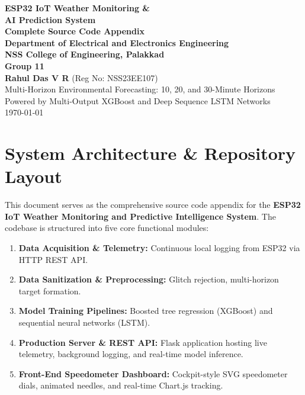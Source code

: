 \documentclass[11pt,a4paper]{article}
\begin{document}
\begin{titlepage}
    \centering
    \vspace*{2cm}
    
    {\Huge \textbf{ESP32 IoT Weather Monitoring \&\\ AI Prediction System}}\\[0.8cm]
    {\LARGE \textbf{Complete Source Code Appendix}}\\[1.5cm]
    
    \textbf{Department of Electrical and Electronics Engineering}\\[0.3cm]
    \textbf{NSS College of Engineering, Palakkad}\\[1.5cm]
    
    \textbf{Group 11}\\[0.4cm]
    \textbf{Rahul Das V R} (Reg No: NSS23EE107)\\[2.5cm]
    
    \vfill
    {\large Multi-Horizon Environmental Forecasting: 10, 20, and 30-Minute Horizons}\\[0.2cm]
    {\large Powered by Multi-Output XGBoost and Deep Sequence LSTM Networks}\\[0.5cm]
    \today
\end{titlepage}

\tableofcontents
\newpage

\section{System Architecture \& Repository Layout}
This document serves as the comprehensive source code appendix for the \textbf{ESP32 IoT Weather Monitoring and Predictive Intelligence System}. The codebase is structured into five core functional modules:

\begin{enumerate}
    \item \textbf{Data Acquisition \& Telemetry:} Continuous local logging from ESP32 via HTTP REST API.
    \item \textbf{Data Sanitization \& Preprocessing:} Glitch rejection, multi-horizon target formation.
    \item \textbf{Model Training Pipelines:} Boosted tree regression (XGBoost) and sequential neural networks (LSTM).
    \item \textbf{Production Server \& REST API:} Flask application hosting live telemetry, background logging, and real-time model inference.
    \item \textbf{Front-End Speedometer Dashboard:} Cockpit-style SVG speedometer dials, animated needles, and real-time Chart.js tracking.
\end{enumerate}
\end{document}
